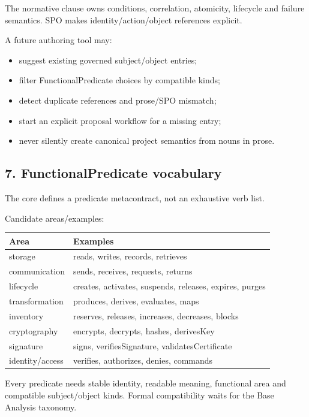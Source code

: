\documentclass[
  10pt,
]{article}
\providecommand{\tightlist}{%
  \setlength{\itemsep}{0pt}\setlength{\parskip}{0pt}}
\begin{document}
The normative clause owns conditions, correlation, atomicity, lifecycle
and failure semantics. SPO makes identity/action/object references
explicit.

A future authoring tool may:

\begin{itemize}
\tightlist
\item
  suggest existing governed subject/object entries;
\item
  filter FunctionalPredicate choices by compatible kinds;
\item
  detect duplicate references and prose/SPO mismatch;
\item
  start an explicit proposal workflow for a missing entry;
\item
  never silently create canonical project semantics from nouns in prose.
\end{itemize}

\subsection{7. FunctionalPredicate
vocabulary}\label{7-functionalpredicate-vocabulary}

The core defines a predicate metacontract, not an exhaustive verb list.

Candidate areas/examples:

\begin{longtable}[]{@{}ll@{}}
\toprule\noalign{}
Area & Examples \\
\midrule\noalign{}
\endhead
\bottomrule\noalign{}
\endlastfoot
storage & reads, writes, records, retrieves \\
communication & sends, receives, requests, returns \\
lifecycle & creates, activates, suspends, releases, expires, purges \\
transformation & produces, derives, evaluates, maps \\
inventory & reserves, releases, increases, decreases, blocks \\
cryptography & encrypts, decrypts, hashes, derivesKey \\
signature & signs, verifiesSignature, validatesCertificate \\
identity/access & verifies, authorizes, denies, commands \\
\end{longtable}

Every predicate needs stable identity, readable meaning, functional area
and compatible subject/object kinds. Formal compatibility waits for the
Base Analysis taxonomy.
\end{document}
